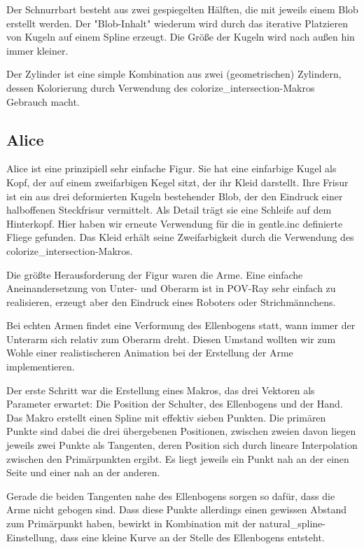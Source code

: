 \documentclass[twocolumn]{article}
\begin{document}
Der Schnurrbart besteht aus zwei gespiegelten Hälften, die mit jeweils einem Blob erstellt werden.
Der "Blob-Inhalt" wiederum wird durch das iterative Platzieren von Kugeln auf einem Spline erzeugt.
Die Größe der Kugeln wird nach außen hin immer kleiner.

Der Zylinder ist eine simple Kombination aus zwei (geometrischen) Zylindern, dessen Kolorierung durch Verwendung des colorize\_intersection-Makros Gebrauch macht.

\subsection{Alice}
Alice ist eine prinzipiell sehr einfache Figur. Sie hat eine einfarbige Kugel als Kopf, der auf einem zweifarbigen Kegel sitzt, der ihr Kleid darstellt.
Ihre Frisur ist ein aus drei deformierten Kugeln bestehender Blob, der den Eindruck einer halboffenen Steckfrisur vermittelt.
Als Detail trägt sie eine Schleife auf dem Hinterkopf. Hier haben wir erneute Verwendung für die in gentle.inc definierte Fliege gefunden.
Das Kleid erhält seine Zweifarbigkeit durch die Verwendung des colorize\_intersection-Makros.

Die größte Herausforderung der Figur waren die Arme.
Eine einfache Aneinandersetzung von Unter- und Oberarm ist in POV-Ray sehr einfach zu realisieren, erzeugt aber den Eindruck eines Roboters oder Strichmännchens.

Bei echten Armen findet eine Verformung des Ellenbogens statt, wann immer der Unterarm sich relativ zum Oberarm dreht.
Diesen Umstand wollten wir zum Wohle einer realistischeren Animation bei der Erstellung der Arme implementieren.

Der erste Schritt war die Erstellung eines Makros, das drei Vektoren als Parameter erwartet: Die Position der Schulter, des Ellenbogens und der Hand.
Das Makro erstellt einen Spline mit effektiv sieben Punkten.
Die primären Punkte sind dabei die drei übergebenen Positionen, zwischen zweien davon liegen jeweils zwei Punkte als Tangenten, deren Position sich durch lineare Interpolation zwischen den Primärpunkten ergibt. Es liegt jeweils ein Punkt nah an der einen Seite und einer nah an der anderen.

Gerade die beiden Tangenten nahe des Ellenbogens sorgen so dafür, dass die Arme nicht gebogen sind. Dass diese Punkte allerdings einen gewissen Abstand zum Primärpunkt haben, bewirkt in Kombination mit der natural\_spline-Einstellung, dass eine kleine Kurve an der Stelle des Ellenbogens entsteht.
\end{document}
